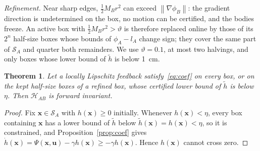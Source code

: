 \documentclass[journal]{IEEEtran}
\newtheorem{theorem}{Theorem}
\theoremstyle{definition}
\newcommand{\norm}[1]{\left\lVert #1\right\rVert}
\begin{document}
\emph{Refinement.} Near sharp edges, $\frac12M_Br^2$ can exceed $\norm{\nabla\phi_B}$: the gradient
direction is undetermined on the box, no motion can be certified, and the bodies freeze. An active box
with $\frac12M_Br^2>\vartheta$ is therefore replaced online by those of its $2^n$ half-size boxes whose
bounds of $\phi_A-l_A$ change sign; they cover the same part of $\mathcal S_A$ and quarter both
remainders. We use $\vartheta=0.1$, at most two halvings, and only boxes whose lower bound of $\tilde h$
is below 1~cm.
\begin{theorem}\label{thm:invariance}
Let a locally Lipschitz feedback satisfy~\eqref{eq:coef} on every box, or on the kept half-size boxes of
a refined box, whose certified lower bound of $\tilde h$ is below $\eta$. Then $\mathcal H_{AB}$ is
forward invariant.
\end{theorem}
\begin{proof}
Fix $\mathbf x\in\mathcal S_A$ with $h(\mathbf x)\ge0$ initially. Whenever $h(\mathbf x)<\eta$, every
box containing $\mathbf x$ has a lower bound of $\tilde h$ below $\tilde h(\mathbf x)=h(\mathbf x)<\eta$,
so it is constrained, and Proposition~\ref{prop:coef} gives
$\dot h(\mathbf x)=\Psi(\mathbf x,\mathbf u)-\gamma h(\mathbf x)\ge-\gamma h(\mathbf x)$. Hence
$h(\mathbf x)$ cannot cross zero.
\end{proof}

\end{document}
